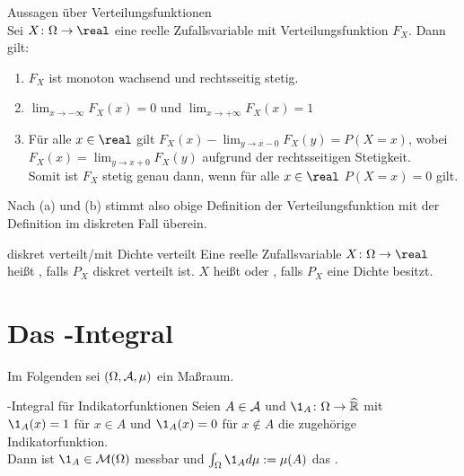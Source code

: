 \begin{Satz}{Aussagen über Verteilungsfunktionen}\\
    Sei $X\colon \Omega \rightarrow \real$ eine reelle Zufallsvariable mit Verteilungsfunktion
    $F_X$.
    Dann gilt:
    \begin{enumerate}
        \item
        $F_X$ ist monoton wachsend und rechtsseitig stetig.

        \item
        $\lim_{x \to -\infty} F_X(x) = 0$ und
        $\lim_{x \to +\infty} F_X(x) = 1$

        \item
        Für alle $x \in \real$ gilt $F_X(x) - \lim_{y \to x-0} F_X(y) = P(X = x)$,
        wobei $F_X(x) = \lim_{y \to x+0} F_X(y)$ aufgrund der rechtsseitigen Stetigkeit.\\
        Somit ist $F_X$ stetig genau dann, wenn für alle $x \in \real$ $P(X = x) = 0$ gilt.
    \end{enumerate}
\end{Satz}

\begin{Bem}
    Nach (a) und (b) stimmt also obige Definition der Verteilungsfunktion mit der
    Definition im diskreten Fall überein.
\end{Bem}

\begin{Def}{diskret verteilt/mit Dichte verteilt}
    Eine reelle Zufallsvariable $X\colon \Omega \rightarrow \real$ heißt
    , falls $P_X$ diskret verteilt ist.
    $X$ heißt  oder ,
    falls $P_X$ eine Dichte besitzt.
\end{Def}

\pagebreak

\section{%
    Das -Integral%
}

\begin{Bem}
    Im Folgenden sei $(\Omega, \mathcal{A}, \mu)$ ein Maßraum.
\end{Bem}

\begin{Def}{-Integral für Indikatorfunktionen}
    Seien $A \in \mathcal{A}$ und $\1_A\colon \Omega \rightarrow \extreal$ mit\\
    $\1_A(x) = 1$ für $x \in A$ und $\1_A(x) = 0$ für $x \notin A$
    die zugehörige Indikatorfunktion.\\
    Dann ist $\1_A \in \M(\Omega)$ messbar und
    $\int_\Omega \1_A d\mu := \mu(A)$ das .
\end{Def}

